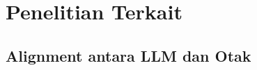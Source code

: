 
 

\section{Penelitian Terkait}
\label{sl_plt}

\subsection{Alignment antara LLM dan Otak}
\label{sub:plt_alignment}

